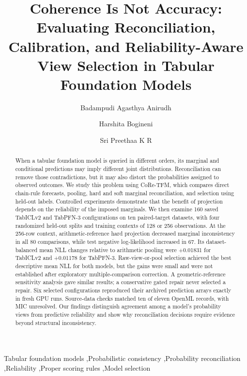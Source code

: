 \documentclass[a4paper,fleqn]{cas-sc}
\begin{document}
\title[mode=title]{Coherence Is Not Accuracy: Evaluating Reconciliation, Calibration, and Reliability-Aware View Selection in Tabular Foundation Models}

\author[vit]{Badampudi Agasthya Anirudh}
\author[vit]{Harshita Bogineni}
\author[vit]{Sri Preethaa K R}
\cormark[1]

\begin{abstract}
When a tabular foundation model is queried in different orders, its marginal and conditional predictions may imply different joint distributions. Reconciliation can remove those contradictions, but it may also distort the probabilities assigned to observed outcomes. We study this problem using CoRe-TFM, which compares direct chain-rule forecasts, pooling, hard and soft marginal reconciliation, and selection using held-out labels. Controlled experiments demonstrate that the benefit of projection depends on the reliability of the imposed marginals. We then examine 160 saved TabICLv2 and TabPFN-3 configurations on ten paired-target datasets, with four randomized held-out splits and training contexts of 128 or 256 observations. At the 256-row context, arithmetic-reference hard projection decreased marginal inconsistency in all 80 comparisons, while test negative log-likelihood increased in 67. Its dataset-balanced mean NLL changes relative to arithmetic pooling were +0.01831 for TabICLv2 and +0.01178 for TabPFN-3. Raw-view-or-pool selection achieved the best descriptive mean NLL for both models, but the gains were small and were not established after exploratory multiple-comparison correction. A geometric-reference sensitivity analysis gave similar results; a conservative gated repair never selected a repair. Six selected configurations reproduced their archived prediction arrays exactly in fresh GPU runs. Source-data checks matched ten of eleven OpenML records, with MIC unresolved. Our findings distinguish agreement among a model's probability views from predictive reliability and show why reconciliation decisions require evidence beyond structural inconsistency.
\end{abstract}

\begin{keywords}
Tabular foundation models \sep Probabilistic consistency \sep Probability reconciliation \sep Reliability \sep Proper scoring rules \sep Model selection
\end{keywords}
\end{document}
